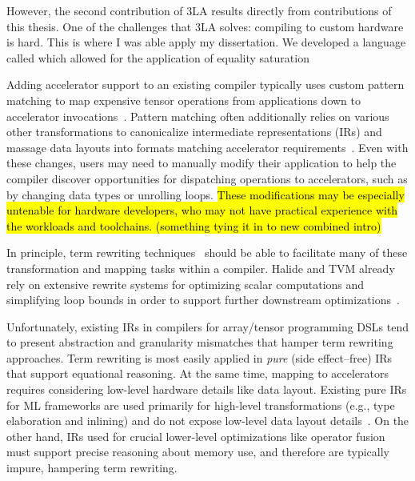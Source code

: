 However,
  the second contribution of 3LA
  results directly from contributions
  of this thesis.
One of the challenges
  that 3LA solves:
  compiling to custom hardware is hard.
This is where I was able
  apply my dissertation.
We developed a language
  called \g
  which allowed for the application
  of equality saturation



Adding accelerator support to
  an existing compiler typically
  uses custom pattern matching to
  map expensive tensor operations
  from applications down to
  accelerator invocations~\cite{
    yang2020interstellar, byoc}.
Pattern matching often additionally relies on
  various other transformations
  to canonicalize intermediate representations (IRs)
  and massage data layouts into
  formats matching accelerator requirements~\cite{nvidia2020nhwc}.
Even with these changes,
  users may need to manually modify their application to
  help the compiler discover opportunities
  for dispatching operations to accelerators, 
  such as by changing data types or unrolling loops.
\hl{
These modifications may be especially
  untenable
  for hardware developers,
  who may not have practical experience
  with the workloads
  and toolchains. 
(something tying it in to new combined intro)
}
    
In principle, term rewriting techniques~\cite{baader1998term}
  should be able to facilitate many of
  these transformation and mapping tasks
  within a compiler.
Halide and TVM already rely
  on extensive rewrite systems for
  optimizing scalar computations and
  simplifying loop bounds in order to
  support further downstream optimizations~\cite{newcomb2020halide-rewrite,
  hagedorn2020func-high-perf}.

Unfortunately, existing IRs in compilers for
  array/tensor programming DSLs tend to
  present abstraction and granularity mismatches
  that hamper term rewriting approaches.
Term rewriting is most easily applied in
  \textit{pure} (side effect--free) IRs
  that support equational reasoning.
At the same time,
  mapping to accelerators requires considering
  low-level hardware details like data layout.
Existing pure IRs for ML frameworks are used
  primarily for high-level transformations
  (e.g., type elaboration and inlining)
  and do not expose low-level data layout details~\cite{relay}.
On the other hand,
  IRs used for crucial lower-level optimizations like
  operator fusion must support
  precise reasoning about memory use,
  and therefore are typically impure,
  hampering term rewriting.%

